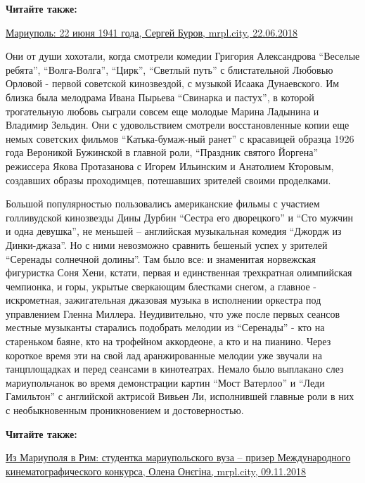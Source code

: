\textbf{Читайте также:} 

\href{https://archive.org/details/22_06_2018.sergij_burov.mrpl_city.mariupol_22_iunja_1941_goda}{Мариуполь: 22 июня 1941 года, Сергей Буров, mrpl.city, 22.06.2018}

Они от души хохотали, когда смотрели комедии Григория Александрова \enquote{Веселые
ребята}, \enquote{Волга-Волга}, \enquote{Цирк}, \enquote{Светлый путь} с блистательной Любовью Орловой
- первой советской кинозвездой, с музыкой Исаака Дунаевского. Им близка была
мелодрама Ивана Пырьева \enquote{Свинарка и пастух}, в которой трогательную любовь
сыграли совсем еще молодые Марина Ладынина и Владимир Зельдин. Они с
удовольствием смотрели восстановленные копии еще немых советских фильмов
\enquote{Катька-бумаж\hyp{}ный ранет} с красавицей образца 1926 года Вероникой Бужинской в
главной роли, \enquote{Праздник святого Йоргена} режиссера Якова Протазанова с Игорем
Ильинским и Анатолием Кторовым, создавших образы проходимцев, потешавших
зрителей своими проделками.

Большой популярностью пользовались американские фильмы с участием голливудской
кинозвезды Дины Дурбин \enquote{Сестра его дворецкого} и \enquote{Сто мужчин и одна девушка},
не меньшей – английская музыкальная комедия \enquote{Джордж из Динки-джаза}. Но с ними
невозможно сравнить бешеный успех у зрителей \enquote{Серенады солнечной долины}. Там
было все: и знаменитая норвежская фигуристка Соня Хени, кстати, первая и
единственная трехкратная олимпийская чемпионка, и горы, укрытые сверкающим
блестками снегом, а главное - искрометная, зажигательная джазовая музыка в
исполнении оркестра под управлением Гленна Миллера. Неудивительно, что уже
после первых сеансов местные музыканты старались подобрать мелодии из
\enquote{Серенады} - кто на стареньком баяне, кто на трофейном аккордеоне, а кто и на
пианино. Через короткое время эти на свой лад аранжированные мелодии уже
звучали на танцплощадках и перед сеансами в кинотеатрах. Немало было выплакано
слез мариупольчанок во время демонстрации картин \enquote{Мост Ватерлоо} и \enquote{Леди
Гамильтон} с английской актрисой Вивьен Ли, исполнившей главные роли в них с
необыкновенным проникновением и достоверностью.

\textbf{Читайте также:} 

\href{https://mrpl.city/news/view/iz-mariupolya-v-rim-studentka-mariupolskogo-vuzaprizer-mezhdunarodnogo-kinematograficheskogo-konkursa-foto-plusvideo}{Из Мариуполя в Рим: студентка мариупольского вуза – призер Международного кинематографического конкурса, Олена Онєгіна, mrpl.city, 09.11.2018}

